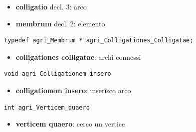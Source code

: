 \documentclass[8pt]{book}
\begin{document}
\begin{itemize}

\item
  \textbf{colligatio} decl. 3: arco
\item
  \textbf{membrum} decl. 2: elemento
\end{itemize}

\begin{spacing}{0.9}
  \begin{small}
    \begin{tcolorbox}
\begin{verbatim}
typedef agri_Membrum * agri_Colligationes_Colligatae;
\end{verbatim}
  \end{tcolorbox}
    \end{small}
      \end{spacing}

\begin{itemize}

\item
  \textbf{colligationes colligatae}: archi connessi
\end{itemize}

\begin{spacing}{0.9}
  \begin{small}
    \begin{tcolorbox}
\begin{verbatim}
void agri_Colligationem_insero
\end{verbatim}
  \end{tcolorbox}
    \end{small}
      \end{spacing}

\begin{itemize}

\item
  \textbf{colligationem insero}: inserisco arco
\end{itemize}

\begin{spacing}{0.9}
  \begin{small}
    \begin{tcolorbox}
\begin{verbatim}
int agri_Verticem_quaero
\end{verbatim}
  \end{tcolorbox}
    \end{small}
      \end{spacing}

\begin{itemize}

\item
  \textbf{verticem quaero}: cerco un vertice
\end{itemize}
\end{document}
